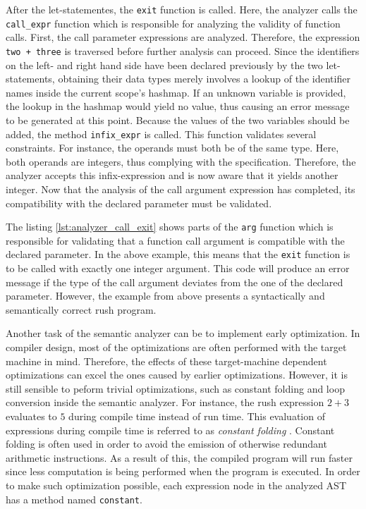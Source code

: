 After the let-statementes, the \texttt{exit} function is called.
Here, the analyzer calls the \texttt{call\_expr} function which is responsible for analyzing the validity of function calls.
First, the call parameter expressions are analyzed.
Therefore, the expression \texttt{two + three} is traversed before further analysis can proceed.
Since the identifiers on the left- and right hand side have been declared previously by the two let-statements,
obtaining their data types merely involves a lookup of the identifier names inside the current scope's hashmap.
If an unknown variable is provided, the lookup in the hashmap would yield no value, thus causing an error message to be generated at this point.
Because the values of the two variables should be added, the method \texttt{infix\_expr} is called.
This function validates several constraints.
For instance, the operands must both be of the same type.
Here, both operands are integers, thus complying with the specification.
Therefore, the analyzer accepts this infix-expression and is now aware that it yields another integer.
Now that the analysis of the call argument expression has completed, its compatibility with the declared parameter must be validated.


The listing \ref{lst:analyzer_call_exit} shows parts of the \texttt{arg} function which is responsible for validating that a function call argument is compatible with the declared parameter.
In the above example, this means that the \texttt{exit} function is to be called with exactly one integer argument.
This code will produce an error message if the type of the call argument deviates from the one of the declared parameter.
However, the example from above presents a syntactically and semantically correct rush program.

Another task of the semantic analyzer can be to implement early optimization.
In compiler design, most of the optimizations are often performed with the target machine in mind.
Therefore, the effects of these target-machine dependent optimizations can excel the ones caused by earlier optimizations.
However, it is still sensible to peform trivial optimizations, such as constant folding and loop conversion inside the semantic analyzer.
For instance, the rush expression $2 + 3$ evaluates to $5$ during compile time instead of run time.
This evaluation of expressions during compile time is referred to as \emph{constant folding} \cite[p.~54]{wirth_compiler_construction_2005}.
Constant folding is often used in order to avoid the emission of otherwise redundant arithmetic instructions.
As a result of this, the compiled program will run faster since less computation is being performed when the program is executed.
In order to make such optimization possible, each expression node in the analyzed AST has a method named \texttt{constant}.

